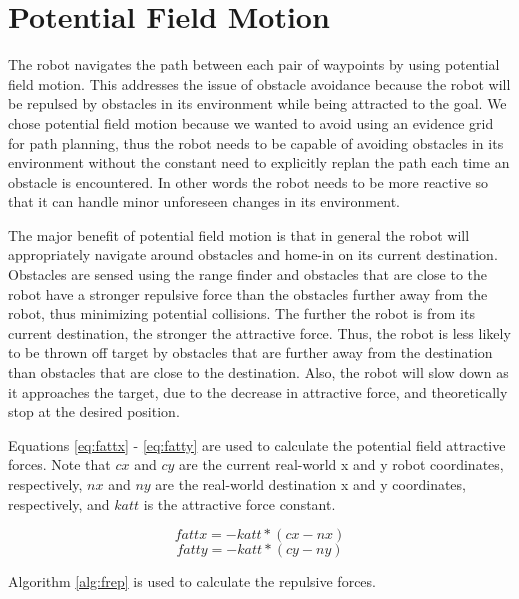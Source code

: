 \documentclass[12pt]{article}
\begin{document}
\section{Potential Field Motion}
\label{sec:potential}

The robot navigates the path between each pair of waypoints by using potential field motion. This addresses the issue of obstacle avoidance because the robot will be repulsed by obstacles in its environment while being attracted to the goal. We chose potential field motion because we wanted to avoid using an evidence grid for path planning, thus the robot needs to be capable of avoiding obstacles in its environment without the constant need to explicitly replan the path each time an obstacle is encountered. In other words the robot needs to be more reactive so that it can handle minor unforeseen changes in its environment.

The major benefit of potential field motion is that in general the robot will appropriately navigate around obstacles and home-in on its current destination. Obstacles are sensed using the range finder and obstacles that are close to the robot have a stronger repulsive force than the obstacles further away from the robot, thus minimizing potential collisions. The further the robot is from its current destination, the stronger the attractive force. Thus, the robot is less likely to be thrown off target by obstacles that are further away from the destination than obstacles that are close to the destination. Also, the robot will slow down as it approaches the target, due to the decrease in attractive force, and theoretically stop at the desired position. 

Equations \ref{eq:fattx} - \ref{eq:fatty} are used to calculate the potential field attractive forces. Note that $cx$ and $cy$ are the current real-world x and y robot coordinates, respectively, $nx$ and $ny$ are the real-world destination x and y coordinates, respectively, and $katt$ is the attractive force constant.

\begin{equation}
fattx = -katt * (cx - nx)
\label{eq:fattx}
\end{equation} 
\begin{equation}
fatty = -katt * (cy - ny)
\label{eq:fatty}
\end{equation} 


Algorithm \ref{alg:frep} is used to calculate the repulsive forces.
\end{document}
